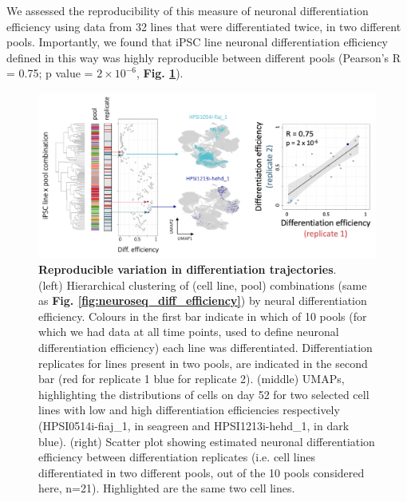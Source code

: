 We assessed the reproducibility of this measure of neuronal differentiation efficiency using data from 32 lines that were differentiated twice, in two different pools. 
Importantly, we found that iPSC line neuronal differentiation efficiency defined in this way was highly reproducible between different pools (Pearson's R = 0.75; p value = $2 \times 10^{-6}$, \textbf{Fig. \ref{fig:neuroseq_diff_eff_replication}}).

\begin{figure}[h]
\centering
\includegraphics[width=15.5cm]{Chapter5/Fig/neuroseq_diff_eff_replication.png}
\caption[Reproducible neural differentiation efficiency]{\textbf{Reproducible variation in differentiation trajectories}.\\
(left) Hierarchical clustering of (cell line, pool) combinations (same as \textbf{Fig. \ref{fig:neuroseq_diff_efficiency}}) by neural differentiation efficiency. 
Colours in the first bar indicate in which of 10 pools (for which we had data at all time points, used to define neuronal differentiation efficiency) each line was differentiated. 
Differentiation replicates for lines present in two pools, are indicated in the second bar (red for replicate 1 blue for replicate 2).
(middle) UMAPs, highlighting the distributions of cells on day 52 for two selected cell lines with low and high differentiation efficiencies respectively (HPSI0514i-fiaj\_1, in seagreen and HPSI1213i-hehd\_1, in dark blue).
(right) Scatter plot showing estimated neuronal differentiation efficiency between differentiation replicates (i.e. cell lines differentiated in two different pools, out of the 10 pools considered here, n=21). 
Highlighted are the same two cell lines.}
\label{fig:neuroseq_diff_eff_replication}
\end{figure}


